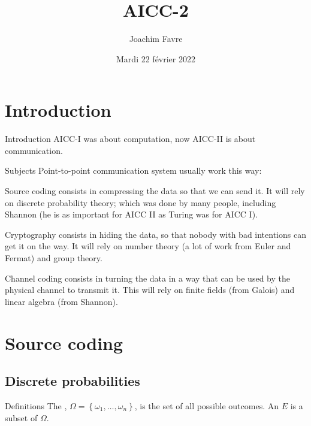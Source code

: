 \documentclass[a4paper]{article}
\title{AICC-2}
\author{Joachim Favre}
\date{Mardi 22 février 2022}
\begin{document}
\maketitle


\section{Introduction}
\begin{parag}{Introduction}
    AICC-I was about computation, now AICC-II is about communication.
\end{parag}

\begin{parag}{Subjects}
    Point-to-point communication system usually work this way:


    Source coding consists in compressing the data so that we can send it. It will rely on discrete probability theory; which was done by many people, including Shannon (he is as important for AICC II as Turing was for AICC I).

    Cryptography consists in hiding the data, so that nobody with bad intentions can get it on the way. It will rely on number theory (a lot of work from Euler and Fermat) and group theory.

    Channel coding consists in turning the data in a way that can be used by the physical channel to transmit it. This will rely on finite fields (from Galois) and linear algebra (from Shannon).
\end{parag}

\section{Source coding}
\subsection{Discrete probabilities}
\begin{parag}{Definitions}
    The , $\Omega = \left\{\omega_1, \ldots, \omega_n\right\}$, is the set of all possible outcomes. An  $E$ is a subset of $\Omega$.
\end{parag}
\end{document}
